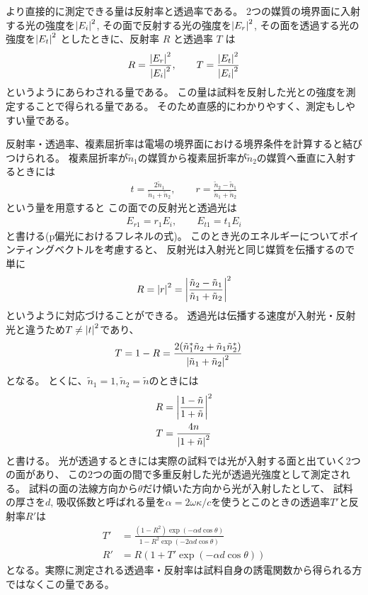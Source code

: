 \documentclass[11pt,dvipdfmx,a4paper]{jsarticle}
\begin{document}
より直接的に測定できる量は反射率と透過率である。
2つの媒質の境界面に入射する光の強度を\(\abs{E_i}^2\),
その面で反射する光の強度を\(\abs{E_r}^2\),
その面を透過する光の強度を\(\abs{E_t}^2\)
としたときに、反射率 \(R\) と透過率 \(T\) は
\begin{align}
    R = \frac{\abs{E_r}^2}{\abs{E_i}^2},\qquad  T = \frac{\abs{E_t}^2}{\abs{E_i}^2}
\end{align}
というようにあらわされる量である。
この量は試料を反射した光との強度を測定することで得られる量である。
そのため直感的にわかりやすく、測定もしやすい量である。

反射率・透過率、複素屈折率は電場の境界面における境界条件を計算すると結びつけられる。
複素屈折率が\(\tilde{n}_1\)の媒質から複素屈折率が\(\tilde{n}_2\)の媒質へ垂直に入射するときには
\begin{align}
    t = \frac{2\tilde{n}_1}{\tilde{n}_1 + \tilde{n}_2},\qquad  r = \frac{\tilde{n}_2-\tilde{n}_1}{\tilde{n}_1+\tilde{n}_2}
\end{align}
という量を用意すると
この面での反射光と透過光は
\begin{align}
    E_{r1} = r_1 E_i, \qquad E_{t1} = t_1 E_i
\end{align}
と書ける(p偏光におけるフレネルの式)。
このとき光のエネルギーについてポインティングベクトルを考慮すると、
反射光は入射光と同じ媒質を伝播するので単に
\begin{align}
    R = \abs{r}^2 = \abs{\frac{\tilde{n}_2-\tilde{n}_1}{\tilde{n}_1+\tilde{n}_2}}^2
\end{align}
というように対応づけることができる。
透過光は伝播する速度が入射光・反射光と違うため\(T\neq\abs{t}^2\)であり、
\begin{align}
    T &= 1 - R = \frac{2(\tilde{n}_1^*\tilde{n}_2+\tilde{n}_1\tilde{n}_2^*)}{\abs{\tilde{n}_1+\tilde{n}_2}^2}
\end{align}
となる。
とくに、\(\tilde{n}_1=1, \tilde{n}_2 = \tilde{n}\)のときには
\begin{align}
    R & = \abs{\frac{1-\tilde{n}}{1+\tilde{n}}}^2\\
    T & = \frac{4n}{\abs{1+\tilde{n}}^2}
\end{align}
と書ける。
光が透過するときには実際の試料では光が入射する面と出ていく2つの面があり、
この2つの面の間で多重反射した光が透過光強度として測定される。
試料の面の法線方向から\(\theta\)だけ傾いた方向から光が入射したとして、
試料の厚さを\(d\), 吸収係数と呼ばれる量を\(\alpha=2\omega\kappa/c\)を使うとこのときの透過率\(T'\)と反射率\(R'\)は
\begin{align}
    T' &= \frac{(1-R^2)\exp(-\alpha d\cos\theta)}{1-R^2\exp(-2\alpha d\cos\theta)}\\
    R' &= R(1+T'\exp(-\alpha d\cos\theta))
\end{align}
となる。実際に測定される透過率・反射率は試料自身の誘電関数から得られる方ではなくこの量である。
\end{document}
